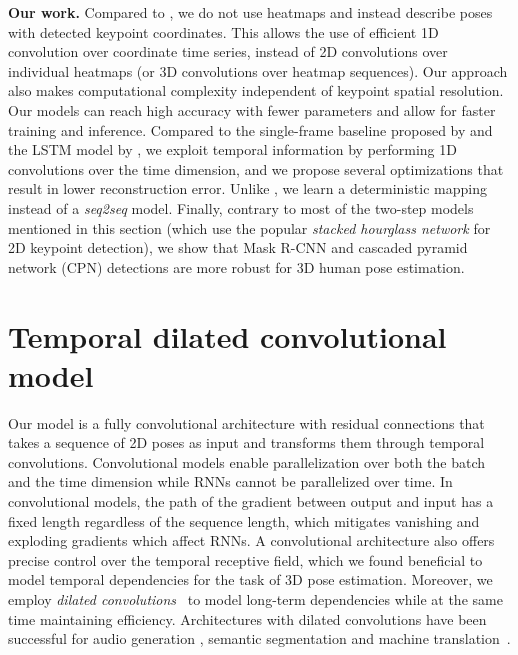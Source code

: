 \documentclass[10pt,twocolumn,letterpaper]{article}
\begin{document}
\noindent\textbf{Our work.}
Compared to \cite{pavlakos:coarse:2017, pavlakos:ordinal:2018}, we do not use heatmaps and instead describe poses with detected keypoint coordinates. This allows the use of efficient 1D convolution over coordinate time series, instead of 2D convolutions over individual heatmaps (or 3D convolutions over heatmap sequences). Our approach also makes computational complexity independent of keypoint spatial resolution.
Our models can reach high accuracy with fewer parameters and allow for faster training and inference. 
Compared to the single-frame baseline proposed by \cite{martinez:simple:2017} and the LSTM model by \cite{hossain:exploiting:2018}, we exploit temporal information by performing 1D convolutions over the time dimension, and we propose several optimizations that result in lower reconstruction error. Unlike \cite{hossain:exploiting:2018}, we learn a deterministic mapping instead of a \emph{seq2seq} model. 
Finally, contrary to most of the two-step models mentioned in this section (which use the popular \emph{stacked hourglass network} \cite{newell:stacked:2016} for 2D keypoint detection), we show that Mask R-CNN \cite{he:mask:2017} and cascaded pyramid network (CPN) \cite{chen:cascaded:2018} detections are more robust for 3D human pose estimation.



\section{Temporal dilated convolutional model} 
\label{sec:approach_conv}

Our model is a fully convolutional architecture with residual connections that takes a sequence of 2D poses as input and transforms them through temporal convolutions.
Convolutional models enable parallelization over both the batch and the time dimension while RNNs cannot be parallelized over time.
In convolutional models, the path of the gradient between output and input has a fixed length regardless of the sequence length, which mitigates vanishing and exploding gradients which affect RNNs. 
A convolutional architecture also offers precise control over the temporal receptive field, which we found beneficial to model temporal dependencies for the task of 3D pose estimation. 
Moreover, we employ \emph{dilated convolutions}~\cite{holschneider:wavelet:1989} to model long-term dependencies while at the same time maintaining efficiency. 
Architectures with dilated convolutions have been successful for audio generation \cite{oord:wavenet:2016}, semantic segmentation \cite{yu:multi:2015} and machine translation~\cite{kalchbrenner:bytenet:2016}. 
\end{document}

